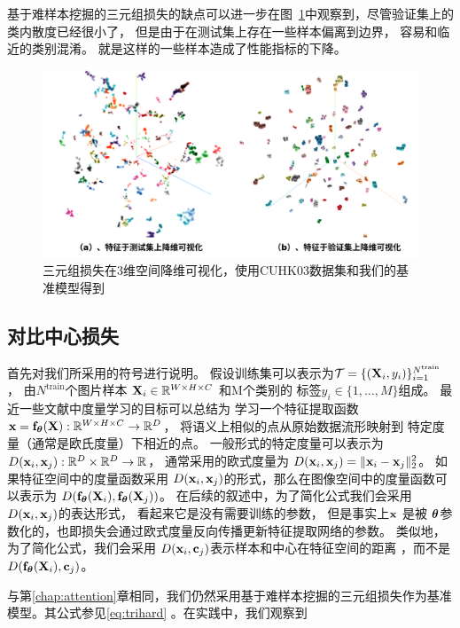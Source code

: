 基于难样本挖掘的三元组损失的缺点可以进一步在图~\ref{fig:tsne}中观察到，尽管验证集上的类内散度已经很小了，
但是由于在测试集上存在一些样本偏离到边界，
容易和临近的类别混淆。
就是这样的一些样本造成了性能指标的下降。

\begin{figure}
	\centering
	\includegraphics[width=.95\textwidth]{fig/tsne.png}
	\caption{三元组损失在3维空间降维可视化，使用CUHK03数据集和我们的基准模型得到}
	\label{fig:tsne}
\end{figure}

\subsection{对比中心损失}

首先对我们所采用的符号进行说明。
假设训练集可以表示为$\mathcal{T}=\{({\mathbf{X}}_i,y_i)\}_{i=1}^{N^{\textrm{train}}}$， 由$N^{\textrm{train}}$个图片样本
${\mathbf{X}}_i \in {\mathbb{R}}^{W\times H\times C}$
和M个类别的
标签$y_i \in \{1,\dots, M\}$组成。
最近一些文献中度量学习的目标可以总结为
学习一个特征提取函数
${\mathbf{x}} = {\mathbf{f}}_{\boldsymbol{\theta}} ({\mathbf{X}}): {\mathbb{R}}^{W \times H\times C} \rightarrow \mathbb{R}^D$，
将语义上相似的点从原始数据流形映射到
特定度量（通常是欧氏度量）下相近的点。
一般形式的特定度量可以表示为$D( {\mathbf{x}}_i, {\mathbf{x}}_j):\mathbb{R}^D \times \mathbb{R}^D \rightarrow \mathbb{R}$，
通常采用的欧式度量为
$D({\mathbf{x}}_i,{\mathbf{x}}_j)=\|{\mathbf{x}}_i - {\mathbf{x}}_j\|_2^2$。
如果特征空间中的度量函数采用
$D({\mathbf{x}}_i,  {\mathbf{x}}_j)$的形式，那么在图像空间中的度量函数可以表示为
$D({\mathbf{f}}_{\boldsymbol{\theta}}({\mathbf{X}}_i), {\mathbf{f}}_{\boldsymbol{\theta}}({\mathbf{X}}_j))$。
在后续的叙述中，为了简化公式我们会采用$D({\mathbf{x}}_i,  {\mathbf{x}}_j)$的表达形式，
看起来它是没有需要训练的参数，
但是事实上${\mathbf{x}}$ 是被 ${\boldsymbol{\theta}}$参数化的，也即损失会通过欧式度量反向传播更新特征提取网络的参数。
类似地，
为了简化公式，我们会采用
$D({\mathbf{x}}_i,{\mathbf{c}}_j)$表示样本和中心在特征空间的距离
，而不是$D({\mathbf{f}}_{\boldsymbol{\theta}}({\mathbf{X}}_i), {\mathbf{c}}_j)$。

与第\ref{chap:attention}章相同，我们仍然采用基于难样本挖掘的三元组损失作为基准模型。其公式参见\ref{eq:trihard} 。在实践中，我们观察到

